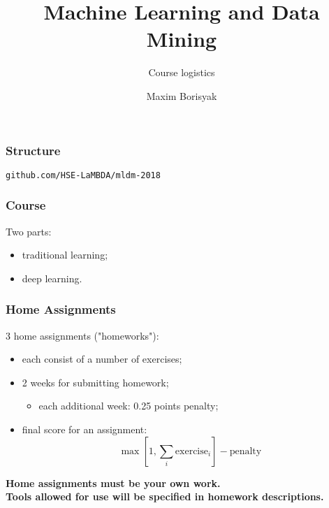 \documentclass[mathserif, aspectratio=43]{beamer}
\title{Machine Learning and Data Mining}
\subtitle{Course logistics}
\author{Maxim Borisyak}
\institute{National Research University Higher School of Economics (HSE)}
\begin{document}
\begin{frame}[plain]
	\titlepage
\end{frame}

\begin{frame}[fragile]
\frametitle{Structure}
{\Large
\texttt{github.com/HSE-LaMBDA/mldm-2018}
}

\end{frame}


\begin{frame}[fragile]
\frametitle{Course}
Two parts:
\begin{itemize}
\item traditional learning;
\item deep learning.
\end{itemize}

\end{frame}


\begin{frame}[fragile]
\frametitle{Home Assignments}
3 home assignments ("homeworks"):
\begin{itemize}
\item each consist of a number of exercises;
\item 2 weeks for submitting homework;\begin{itemize}
\item each additional week: 0.25 points penalty;
\end{itemize}

\item final score for an assignment:
$$\max \left[ 1, \sum_i \mathrm{exercise}_i \right] - \mathrm{penalty}$$
\end{itemize}
\begin{center}
\textbf{
  Home assignments must be your own work. \\
  Tools allowed for use will be specified in homework descriptions.
}
\end{center}

\end{frame}
\end{document}
